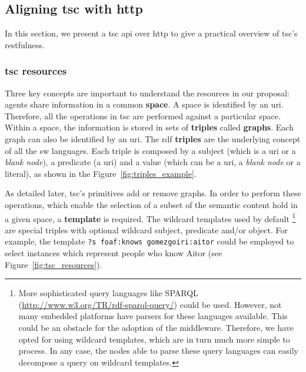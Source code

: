 \subsection{Aligning \acs{tsc} with \acs{http}}


In this section, we present a \ac{tsc} \acs{api} over \ac{http} to give a practical overview of \ac{tsc}'s \acs{rest}fulness.

\subsubsection{\acs{tsc} resources}

Three key concepts are important to understand the resources in our proposal: agents share information in a common \textbf{space}.
A space is identified by an \acs{uri}.
Therefore, all the operations in \ac{tsc} are performed against a particular space.
Within a space, the information is stored in sets of \textbf{triples} called \textbf{graphs}.
Each graph can also be identified by an \acs{uri}.
The \acs{rdf} \textbf{triples} are the underlying concept of all the \ac{sw} languages.
Each triple is composed by a subject (which is a \acs{uri} or a \emph{blank node}), a predicate (a \acs{uri}) and a value (which can be a \acs{uri}, a \emph{blank node} or a literal), as shown in the Figure~\ref{fig:triples_example}.

As detailed later, \ac{tsc}'s primitives add or remove graphs.
In order to perform these operations, which enable the selection of a subset of the semantic content hold in a given space, a \textbf{template} is required. %
The wildcard templates used by default
\footnote{
  More sophisticated query languages like SPARQL (\url{http://www.w3.org/TR/rdf-sparql-query/}) could be used. %
  However, not many embedded platforms have parsers for these languages available.
  This could be an obstacle for the adoption of the middleware.
  Therefore, we have opted for using wildcard templates, which are in turn much more simple to process.
  In any case, the nodes able to parse these query languages can easily decompose a query on wildcard templates.
}
are special triples with optional wildcard subject, predicate and/or object.
For example, the template \texttt{?s foaf:knows gomezgoiri:aitor} could be employed to select instances which represent people who know Aitor (see Figure~\ref{fig:tsc_resources}).

